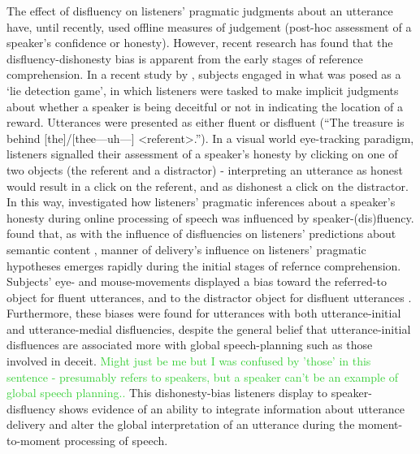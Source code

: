 \documentclass[a4paper,man,natbib]{apa6}
\newcommand\thenote[1]{\textcolor{LimeGreen}{#1}}
\begin{document}
The effect of disfluency on listeners' pragmatic judgments about an utterance have, until recently, used offline measures of judgement (post-hoc assessment of a speaker's confidence or honesty). 
However, recent research has found that the disfluency-dishonesty bias is apparent from the early stages of reference comprehension. 
In a recent study by \citet{Loy2016}, subjects engaged in what was posed as a `lie detection game', in which listeners were tasked to make implicit judgments about whether a speaker is being deceitful or not in indicating the location of a reward.
Utterances were presented as either fluent or disfluent (``The treasure is behind [the]/[thee---uh---] \textless referent\textgreater .'').
In a visual world eye-tracking paradigm, listeners signalled their assessment of a speaker's honesty by clicking on one of two objects (the referent and a distractor) - interpreting an utterance as honest would result in a click on the referent, and as dishonest a click on the distractor.
In this way, \citet{Loy2016} investigated how listeners' pragmatic inferences about a speaker's honesty during online processing of speech was influenced by speaker-(dis)fluency. \\

\citet{Loy2016} found that, as with the influence of disfluencies on listeners' predictions about semantic content \citep{Arnold2004, Arnold2007, Barr2001}, manner of delivery's influence on listeners' pragmatic hypotheses emerges rapidly during the initial stages of refernce comprehension. 
Subjects' eye- and mouse-movements displayed a bias toward the referred-to object for fluent utterances, and to the distractor object for disfluent utterances \citep{Loy2016}.
Furthermore, these biases were found for utterances with both utterance-initial and utterance-medial disfluencies, despite the general belief that utterance-initial disfluences are associated more with global speech-planning such as those involved in deceit. \thenote{Might just be me but I was confused by 'those' in this sentence - presumably refers to speakers, but a speaker can't be an example of global speech planning..}
This dishonesty-bias listeners display to speaker-disfluency shows evidence of an ability to integrate information about utterance delivery and alter the global interpretation of an utterance during the moment-to-moment processing of speech.\\
\end{document}
